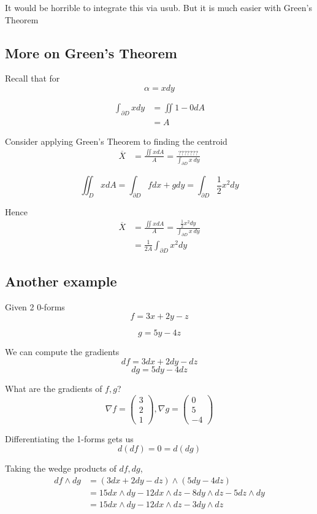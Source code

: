 It would be horrible to integrate this via usub. But it is much easier with Green's Theorem

\subsection{More on Green's Theorem}

Recall that for
\[
  \alpha = xdy
\] 

\begin{align*}
   \int_{\partial D}^{} xdy &= \iint 1 - 0 dA \\
                            &= A
\end{align*}

Consider applying Green's Theorem to finding the centroid
\begin{align*}
   \overline{X} &= \frac{\iint x dA}{A} = \frac{???????}{\int_{\partial D}^{} x\ dy }
\end{align*}

\[
  \iint_D x dA = \int_{\partial D}^{}  f dx +  gdy= \int_{\partial D}^{ }  \frac{1}{2} x^2 dy 
\] 

Hence 
\begin{align*}
   \overline{X} &= \frac{\iint x dA}{A} = \frac{ \frac{1}{2} x^2 dy}{\int_{\partial D}^{} x\ dy } \\
                &= \frac{1}{2A} \int_{\partial D}^{} x^2 dy 
\end{align*}


\subsection{Another example}
Given 2 0-forms
\[
  f= 3x + 2y - z
\] 

\[
  g = 5y - 4z
\] 

We can compute the gradients
\[
  df = 3dx + 2dy - dz
\] 
\[
  dg = 5dy - 4dz
\] 

What are the gradients of $f, g$?
 \[
  \nabla f = \begin{pmatrix} 3 \\ 2\\ 1 \end{pmatrix}  , \nabla g = \begin{pmatrix} 0 \\ 5 \\ -4 \end{pmatrix} 
\] 

Differentiating the 1-forms gets us
\[
  d(df) = 0 = d(dg)
\] 

Taking the wedge products of $df, dg$,
\begin{align*}
   df \wedge dg &= \left( 3dx + 2dy - dz \right) \wedge \left( 5dy - 4dz \right)  \\
                &= 15 dx \wedge dy - 12 dx \wedge dz - 8 dy \wedge dz - 5dz \wedge dy \\
                &= 15 dx \wedge dy - 12 dx \wedge dz - 3 dy \wedge dz
\end{align*}


